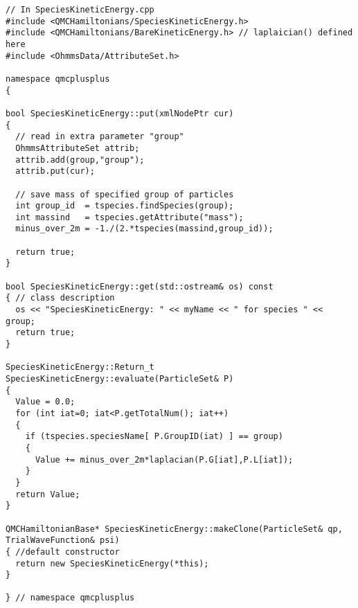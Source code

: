 \documentclass[aps,prl,preprint]{revtex4-1}
\begin{document}
\begin{lstlisting}
// In SpeciesKineticEnergy.cpp
#include <QMCHamiltonians/SpeciesKineticEnergy.h>
#include <QMCHamiltonians/BareKineticEnergy.h> // laplaician() defined here
#include <OhmmsData/AttributeSet.h>

namespace qmcplusplus
{

bool SpeciesKineticEnergy::put(xmlNodePtr cur)
{
  // read in extra parameter "group"
  OhmmsAttributeSet attrib;
  attrib.add(group,"group");
  attrib.put(cur);
  
  // save mass of specified group of particles
  int group_id  = tspecies.findSpecies(group);
  int massind   = tspecies.getAttribute("mass");
  minus_over_2m = -1./(2.*tspecies(massind,group_id)); 

  return true;
}

bool SpeciesKineticEnergy::get(std::ostream& os) const
{ // class description
  os << "SpeciesKineticEnergy: " << myName << " for species " << group;
  return true;
}

SpeciesKineticEnergy::Return_t SpeciesKineticEnergy::evaluate(ParticleSet& P)
{
  Value = 0.0;
  for (int iat=0; iat<P.getTotalNum(); iat++)
  {
    if (tspecies.speciesName[ P.GroupID(iat) ] == group)
    {
      Value += minus_over_2m*laplacian(P.G[iat],P.L[iat]);
    }
  }
  return Value;
}

QMCHamiltonianBase* SpeciesKineticEnergy::makeClone(ParticleSet& qp, TrialWaveFunction& psi)
{ //default constructor
  return new SpeciesKineticEnergy(*this);
}

} // namespace qmcplusplus
\end{lstlisting}
\end{document}
